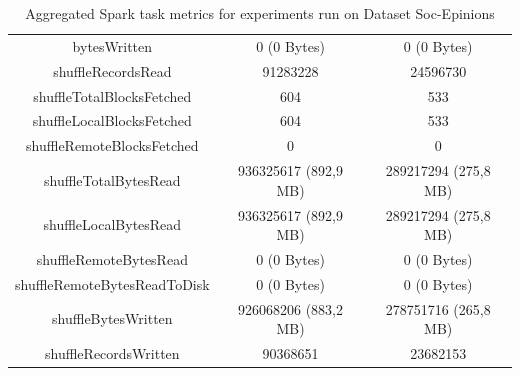 \documentclass[a4paper,11pt, twoside]{article}
\begin{document}
\begin{table}[h!]
\begin{tabular}{ccc}
                        bytesWritten & 0 (0 Bytes) & 0 (0 Bytes) \\
                        shuffleRecordsRead & 91283228 & 24596730 \\
                        shuffleTotalBlocksFetched & 604 & 533 \\
                        shuffleLocalBlocksFetched & 604 & 533 \\
                        shuffleRemoteBlocksFetched & 0 & 0 \\
                        shuffleTotalBytesRead & 936325617 (892,9 MB) & 289217294 (275,8 MB) \\
                        shuffleLocalBytesRead & 936325617 (892,9 MB) & 289217294 (275,8 MB) \\
                        shuffleRemoteBytesRead & 0 (0 Bytes) & 0 (0 Bytes) \\
                        shuffleRemoteBytesReadToDisk & 0 (0 Bytes) & 0 (0 Bytes) \\
                        shuffleBytesWritten & 926068206 (883,2 MB) & 278751716 (265,8 MB) \\
                        shuffleRecordsWritten & 90368651 & 23682153 \\
                    \bottomrule
                \end{tabular}
                    \caption{Aggregated Spark task metrics for experiments run on Dataset Soc-Epinions}
                    \label{tab:taskmetrics3}
            \end{table} 
        
\end{document}

